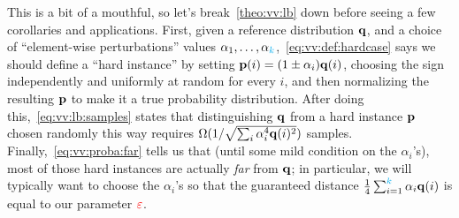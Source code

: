 This is a bit of a mouthful, so let's break~\cref{theo:vv:lb} down before seeing a few corollaries and applications. First, given a reference distribution $\mathbf{q}$, and a choice of ``element-wise perturbations'' values $\alpha_1,\dots,\alpha_{\textcolor{cyan}{k}}$,~\cref{eq:vv:def:hardcase} says we should define a ``hard instance'' by setting $\mathbf{p}(i) = (1\pm \alpha_i)\mathbf{q}(i)$, choosing the sign independently and uniformly at random for every $i$, and then normalizing the resulting $\mathbf{p}$ to make it a true probability distribution. After doing this,~\cref{eq:vv:lb:samples} states that distinguishing $\mathbf{q}$ from a hard instance $\mathbf{p}$ chosen randomly this way requires
$
\Omega(1/\sqrt{\sum_i \alpha_i^4\mathbf{q}(i)^2})
$ samples. Finally,~\cref{eq:vv:proba:far} tells us that (until some mild condition on the $\alpha_i$'s), most of those hard instances are actually \emph{far} from $\mathbf{q}$; in particular, we will typically want to choose the $\alpha_i$'s so that the guaranteed distance
$
\frac{1}{4}\sum_{i=1}^{\textcolor{cyan}{k}} \alpha_i\mathbf{q}(i)
$ is equal to our parameter $\textcolor{red}{\varepsilon}$.\medskip

